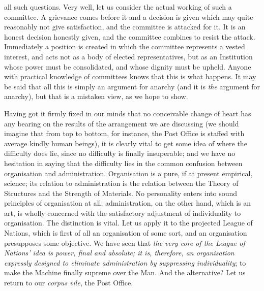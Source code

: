 \documentclass{book}
\begin{document}
all such questions. Very well, let us consider the actual working of such a committee. A grievance comes before it and a decision is given which may quite reasonably not give satisfaction, and the committee is attacked for it. It is an honest decision honestly given, and the committee combines to resist the attack. Immediately a position is created in which the committee represents a vested interest, and acts not as a body of elected representatives, but as an Institution whose power must be consolidated, and whose dignity must be upheld. Anyone with practical knowledge of committees knows that this is what happens. It may be said that all this is simply an argument for anarchy (and it is \emph{the} argument for anarchy), but that is a mistaken view, as we hope to show.

Having got it firmly fixed in our minds that no conceivable change of heart has any bearing on the results of the arrangement we are discussing (we should imagine that from top to bottom, for instance, the Post Office is staffed with average kindly human beings), it is clearly vital to get some idea of where the difficulty does lie, since no difficulty is finally insuperable; and we have no hesitation in saying that the difficulty lies in the common confusion between organisation and administration. Organisation is a pure, if at present empirical, science; its relation to administration is the relation between the Theory of Structures and the Strength of Materials. No personality enters into sound principles of organisation at all; administration, on the other hand, which is an art, is wholly concerned with the satisfactory adjustment of individuality to organisation. The distinction is vital. Let us apply it to the projected League of Nations, which is first of all an organisation of some sort, and an organisation presupposes some objective. We have seen that \emph{the very core of the League of Nations’ idea is power, final and absolute; it is, therefore, an organisation expressly designed to eliminate administration by suppressing individuality}; to make the Machine finally supreme over the Man. And the alternative? Let us return to our \emph{corpus vile}, the Post Office.
\end{document}
